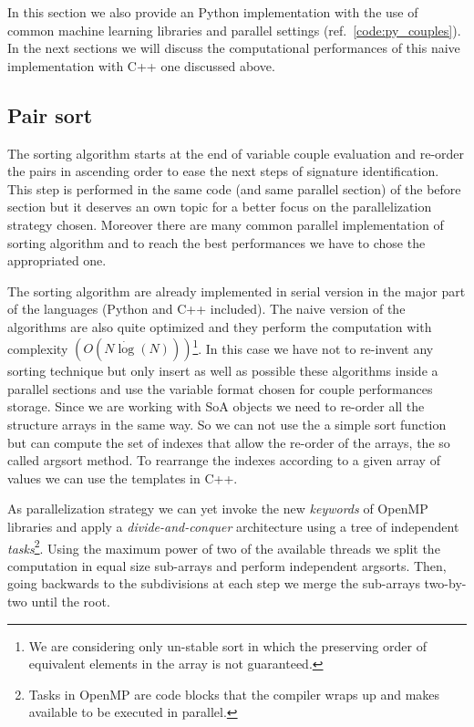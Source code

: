 \documentclass{standalone}
\begin{document}
In this section we also provide an  Python implementation with the use of common machine learning libraries and parallel settings (ref.~\ref{code:py_couples}).
In the next sections we will discuss the computational performances of this naive implementation with C++ one discussed above.



\subsection[Sorting]{Pair sort}\label{implementation:sort}

The sorting algorithm starts at the end of variable couple evaluation and re-order the pairs in ascending order to ease the next steps of signature identification.
This step is performed in the same code (and same parallel section) of the before section but it deserves an own topic for a better focus on the parallelization strategy chosen.
Moreover there are many common parallel implementation of sorting algorithm and to reach the best performances we have to chose the appropriated one.

The sorting algorithm are already implemented in serial version in the major part of the languages (Python and C++ included).
The naive version of the algorithms are also quite optimized and they perform the computation with complexity $(O(N\dot\log(N)))$\footnote{
  We are considering only un-stable sort in which the preserving order of equivalent elements in the array is not guaranteed.
}.
In this case we have not to re-invent any sorting technique but only insert as well as possible these algorithms inside a parallel sections and use the variable format chosen for couple performances storage.
Since we are working with SoA objects we need to re-order all the structure arrays in the same way.
So we can not use the a simple sort function but can compute the set of indexes that allow the re-order of the arrays, the so called \textsf{argsort} method.
To rearrange the indexes according to a given array of values we can use the templates in C++.


As parallelization strategy we can yet invoke the new \emph{keywords} of OpenMP libraries and apply a \emph{divide-and-conquer} architecture using a tree of independent \emph{tasks}\footnote{
  Tasks in OpenMP are code blocks that the compiler wraps up and makes available to be executed in parallel.
}.
Using the maximum power of two of the available threads we split the computation in equal size sub-arrays and perform independent \textsf{argsort}s.
Then, going backwards to the subdivisions at each step we merge the sub-arrays two-by-two until the root.
\end{document}
